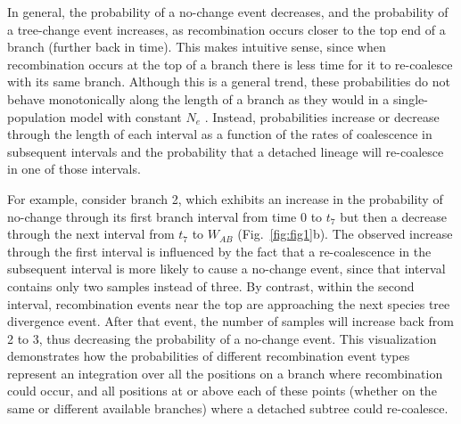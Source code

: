 \documentclass[11pt]{article}
\begin{document}
In general, the probability of a no-change event decreases, and the probability
of a tree-change event increases, as recombination occurs closer to the top
end of a branch (further back in time). This makes intuitive sense, since when 
recombination occurs at the top of a branch there is less time for it to re-coalesce 
with its same branch. Although this is a general trend, these probabilities do not 
behave monotonically along the length of a branch as they would in a 
single-population model with constant $N_e$ \citep{deng_distribution_2021}.
Instead, probabilities increase or decrease through the length of each
interval as a function of the rates of coalescence in subsequent 
intervals and the probability that a detached lineage will 
re-coalesce in one of those intervals.

For example, consider branch 2, which exhibits an increase in the
probability of no-change through its first branch interval from time 0 to
$t_7$ but then a decrease through the next interval from $t_7$ to $W_{AB}$
(Fig.~\ref{fig:fig1}b).
The observed increase through the first interval is influenced by the fact that
a re-coalescence in the subsequent interval is more likely to cause a no-change
event, since that interval contains only two samples instead of three.
By contrast, within the second interval, recombination events near 
the top are approaching the next species tree divergence event. After that event, the 
number of samples will increase back from 2 to 3, 
thus decreasing the probability of a no-change event. 
This visualization demonstrates how the probabilities of different recombination 
event types represent an integration over all the positions on a branch where 
recombination could occur, and all positions at or above each of these points (whether on the 
same or different available branches) where a detached subtree could re-coalesce. 
\end{document}
